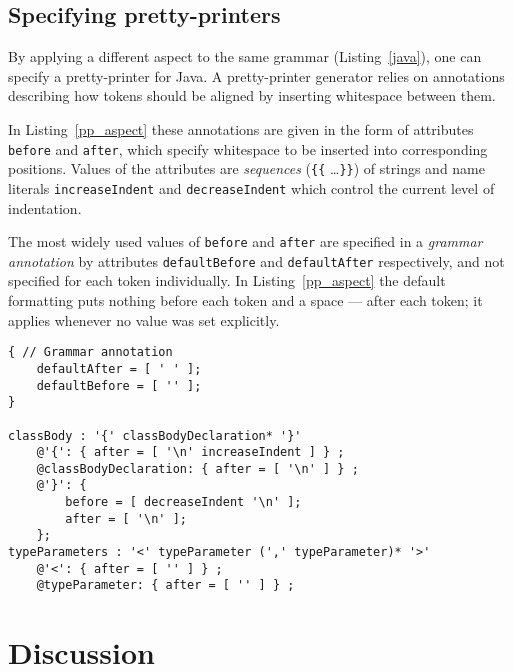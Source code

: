 \documentclass{IOS-Book-Article}     %
\newcommand{\lstref}[1]{Listing~\ref{#1}}
\begin{document}
\subsection{Specifying pretty-printers}

By applying a different aspect to the same grammar (\lstref{java}), one can specify a pretty-printer for Java. A pretty-printer generator relies on annotations describing how tokens should be aligned by inserting whitespace between them. 

In \lstref{pp_aspect} these annotations are given in the form of attributes \texttt{before} and \texttt{after}, which specify whitespace to be inserted into corresponding positions. Values of the attributes are \emph{sequences} (\texttt{\{\{} \ldots \texttt{\}\}}) of strings and name literals \texttt{increaseIndent} and \texttt{decreaseIndent} which control the current level of indentation. 

The most widely used values of \texttt{before} and \texttt{after} are specified in a \emph{grammar annotation} by attributes \texttt{defaultBefore} and \texttt{defaultAfter} respectively, and not specified for each token individually. In \lstref{pp_aspect} the default formatting puts nothing before each token and a space --- after each token; it applies whenever no value was set explicitly.

\begin{lstlisting}[language=Grammatic,caption=Pretty-printing aspect for class declarations in Java,label=pp_aspect,float]
{ // Grammar annotation
	defaultAfter = [ ' ' ]; 
	defaultBefore = [ '' ];
} 
	
classBody : '{' classBodyDeclaration* '}'
	@'{': { after = [ '\n' increaseIndent ] } ;
	@classBodyDeclaration: { after = [ '\n' ] } ;
	@'}': {
		before = [ decreaseIndent '\n' ];
		after = [ '\n' ];
	};
typeParameters : '<' typeParameter (',' typeParameter)* '>' 
	@'<': { after = [ '' ] } ;
	@typeParameter: { after = [ '' ] } ;
\end{lstlisting}

\section{Discussion}\label{Discussion}
\end{document}
